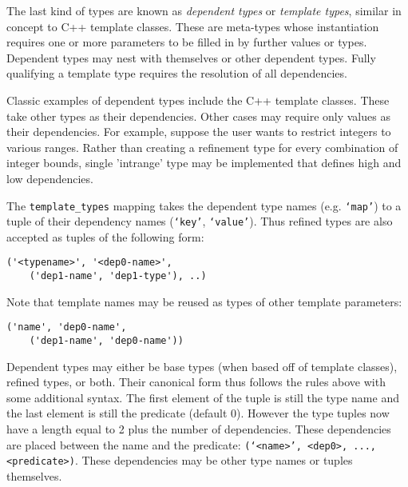 \documentclass{ansconfpaper}
\newcommand{\vin}[1]{\texttt{{#1}}}
\begin{document}
The last kind of types are known as \emph{dependent types} or \emph{template types}, 
similar in concept to C++ template classes.  These are meta-types whose 
instantiation requires one or more parameters to be filled in by further values or
types. Dependent types may nest with themselves or other dependent types.  Fully 
qualifying a template type requires the resolution of all dependencies.

Classic examples of dependent types include the C++ template classes.  These take
other types as their dependencies.  Other cases may require only values as 
their dependencies.  For example, suppose the user wants to restrict integers to 
various ranges.  Rather than creating a refinement type for every combination of 
integer bounds, single 'intrange' type may be implemented that defines high and low 
dependencies.

The \vin{template\_types} mapping takes the dependent type names (e.g. \vin{`map'})
to a tuple of their dependency names (\vin{`key'}, \vin{`value'}).   Thus 
refined types are also accepted as tuples of the following form:
\begin{lstlisting}
('<typename>', '<dep0-name>', 
    ('dep1-name', 'dep1-type'), ..)
\end{lstlisting}
Note that template names may be reused as types of other template parameters:
\begin{lstlisting}
('name', 'dep0-name', 
    ('dep1-name', 'dep0-name'))
\end{lstlisting}

Dependent
types may either be base types (when based off of template classes), refined types,
or both.  Their canonical form thus follows the rules above with some additional 
syntax.  The first element of the tuple is still the type name and the last 
element is still the predicate (default 0).  However the type tuples now have a
length equal to 2 plus the number of dependencies.  These dependencies are 
placed between the name and the predicate: \vin{(`<name>', <dep0>, ..., <predicate>)}.
These dependencies may be other type names or tuples themselves. 
\end{document}

